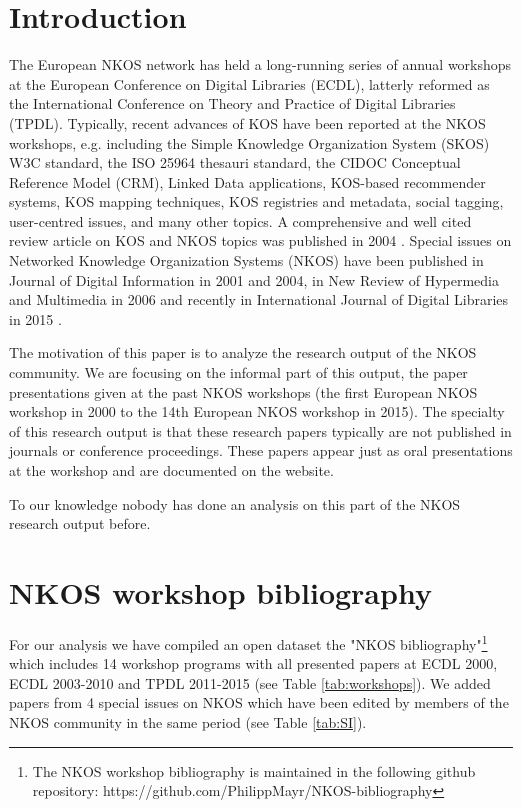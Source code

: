 \documentclass[runningheads,a4paper]{llncs}
\begin{document}
\section{Introduction}\label{intro}

The European NKOS network has held a long-running series of annual workshops at the European Conference on Digital Libraries (ECDL), latterly reformed as the International Conference on Theory and Practice of Digital Libraries (TPDL). 
Typically, recent advances of KOS have been reported at the NKOS workshops, e.g. including the Simple Knowledge Organization System (SKOS) W3C standard, the ISO 25964 thesauri standard, the CIDOC Conceptual Reference Model (CRM), Linked Data applications, KOS-based recommender systems, KOS mapping techniques, KOS registries and metadata, social tagging, user-centred issues, and many other topics. A comprehensive and well cited review article on KOS and NKOS topics was published in 2004 \cite{Zeng2004}. Special issues on Networked Knowledge Organization Systems (NKOS) have been published in Journal of Digital Information in 2001 and 2004, in New Review of Hypermedia and Multimedia in 2006 and recently in International Journal of Digital Libraries in 2015 \cite{Mayr2016}. 

The motivation of this paper is to analyze the research output of the NKOS community. We are focusing on the informal part of this output, the paper presentations given at the past NKOS workshops (the first European NKOS workshop in 2000 to the 14th European NKOS workshop in 2015). The specialty of this research output is that these research papers typically are not published in journals or conference proceedings. These papers appear just as oral presentations at the workshop and are documented on the website. 

To our knowledge nobody has done an analysis on this part of the NKOS research output before. 



\section{NKOS workshop bibliography}\label{dataset}

For our analysis we have compiled an open dataset the "NKOS bibliography"\footnote{The NKOS workshop bibliography is maintained in the following github repository: https://github.com/PhilippMayr/NKOS-bibliography} which includes 14 workshop programs with all presented papers at ECDL 2000, ECDL 2003-2010 and TPDL 2011-2015 (see Table \ref{tab:workshops}). We added papers from 4 special issues on NKOS which have been edited by members of the NKOS community in the same period (see Table \ref{tab:SI}). 
\end{document}
